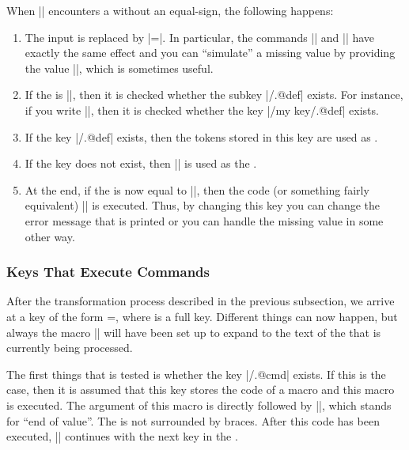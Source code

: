 When |\pgfkeys| encounters a  without an equal-sign, the following
happens:
%
\begin{enumerate}
    \item The input is replaced by |=\pgfkeysnovalue|. In particular,
        the commands || and
        || have exactly the same effect and
        you can ``simulate'' a missing value by providing the value
        |\pgfkeysnovalue|, which is sometimes useful.
    \item If the  is |\pgfkeysnovalue|, then it is checked whether
        the subkey |/.@def| exists. For instance, if you write
        ||, then it is checked whether the key |/my key/.@def|
        exists.
    \item If the key |/.@def| exists, then the tokens stored in this
        key are used as .
    \item If the key does not exist, then |\pgfkeysnovalue| is used as the
        .
    \item At the end, if the  is now equal to
        |\pgfkeysvaluerequired|, then the code (or something fairly equivalent)
        || is executed. Thus, by
        changing this key you can change the error message that is printed or
        you can handle the missing value in some other way.
\end{enumerate}


\subsubsection{Keys That Execute Commands}
\label{section-key-code}

After the transformation process described in the previous subsection, we
arrive at a key of the form =, where  is a full
key. Different things can now happen, but always the macro |\pgfkeyscurrentkey|
will have been set up to expand to the text of the  that is currently
being processed.

The first things that is tested is whether the key |/.@cmd| exists.
If this is the case, then it is assumed that this key stores the code of a
macro and this macro is executed. The argument of this macro is 
directly followed by |\pgfeov|, which stands for ``end of value''. The
 is not surrounded by braces. After this code has been executed,
|\pgfkeys| continues with the next key in the .

